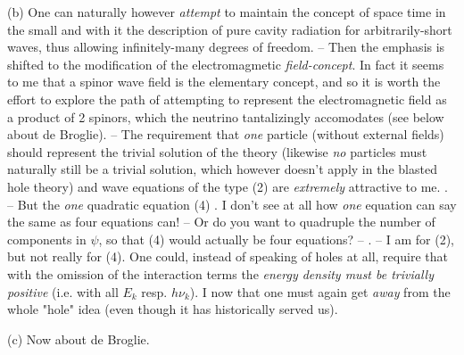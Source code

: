 \documentclass{article}
\newcommand{\nc}[2]{
  \newcommand{#1}{#2}
}
\begin{document}
(b) One can naturally however \textit{attempt} to maintain the concept of space time in the small and with it the description of pure cavity radiation for arbitrarily-short waves, thus allowing infinitely-many degrees of freedom. -- Then the emphasis is shifted to the modification of the electromagmetic \textit{field-concept}. In fact it seems to me that a spinor wave field is the elementary concept, and so it is worth the effort to explore the path of attempting to represent the electromagnetic field as a product of 2 spinors, which the neutrino tantalizingly accomodates (see below about de Broglie). -- The requirement that \textit{one} particle (without external fields) should represent the trivial solution of the theory (likewise \textit{no} particles must naturally still be a trivial solution, which however doesn't apply in the blasted hole theory) and wave equations of the type (2) are \textit{extremely} attractive to me. . -- But the \textit{one} quadratic equation (4) . I don't see at all how \textit{one} equation can say the same as four equations can! -- Or do you want to quadruple the number of components in $\psi$, so that (4) would actually be four equations? -- . -- I am for (2), but not really for (4).
One could, instead of speaking of holes at all, require that with the omission of the interaction terms the \textit{energy density must be trivially positive} (i.e. with all $E_k$ resp. $h\nu_k$). I now  that one must again get \textit{away} from the whole "hole" idea (even though it has historically served us).

(c) Now about de Broglie.
\nc{\vp}{\vec{p}}
\nc{\vE}{\vec{E}}
\nc{\vH}{\vec{H}}
\nc{\vn}{\vec{n}}
\end{document}
